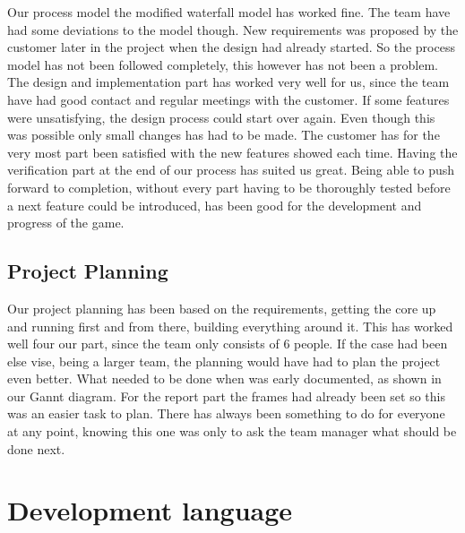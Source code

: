 Our process model the modified waterfall model has worked fine. The team have had some  deviations to the model though. New requirements was proposed by the customer later in the project when the design had already started. So the process model has not been followed completely, this however has not been a problem. The design  and implementation part has worked very well for us, since the team have had good contact and regular meetings with the customer. If some features were unsatisfying, the design process could start over again. Even though this was possible only small changes has had to be made. The customer has for the very most part been satisfied with the new features showed each time. Having the verification part at the end of our process has suited us great. Being able to push forward to completion, without every part having to be thoroughly tested before a next feature could be introduced, has been good for the development and progress of the game. \\

\subsection{Project Planning}

Our project planning has been based on the requirements, getting the core up and running first and from there, building everything around it. This has worked well four our part, since the team only consists of 6 people. If the case had been else vise, being a larger team, the planning would have had to plan the project even better. What needed to be done when was early documented, as shown in our Gannt diagram. For the report part the frames had already been set so this was an easier task to plan. There has always been something to do for everyone at any point, knowing this one was only to ask the team manager what should be done next.


\section{Development language}

